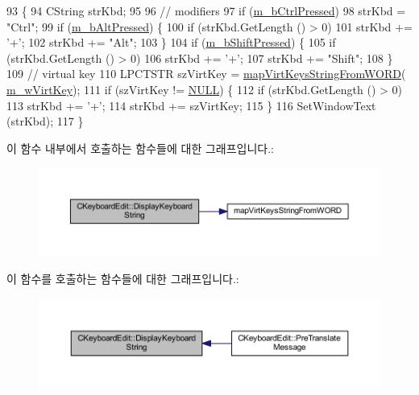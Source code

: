 \begin{DoxyCode}
93 \{
94   CString strKbd;
95 
96   \textcolor{comment}{// modifiers}
97   \textcolor{keywordflow}{if} (\mbox{\hyperlink{class_c_keyboard_edit_a0dbb417bbaaeaa95c00fceaecd210064}{m\_bCtrlPressed}})
98     strKbd = \textcolor{stringliteral}{"Ctrl"};
99   \textcolor{keywordflow}{if} (\mbox{\hyperlink{class_c_keyboard_edit_a724b035848eeca7bebc24e1309afeb6d}{m\_bAltPressed}}) \{
100     \textcolor{keywordflow}{if} (strKbd.GetLength () > 0)
101       strKbd += \textcolor{charliteral}{'+'};
102     strKbd += \textcolor{stringliteral}{"Alt"};
103   \}
104   \textcolor{keywordflow}{if} (\mbox{\hyperlink{class_c_keyboard_edit_ac4a4f45be9ef923961ab92a48a28f789}{m\_bShiftPressed}}) \{
105     \textcolor{keywordflow}{if} (strKbd.GetLength () > 0)
106       strKbd += \textcolor{charliteral}{'+'};
107     strKbd += \textcolor{stringliteral}{"Shift"};
108   \}
109   \textcolor{comment}{// virtual key}
110   LPCTSTR szVirtKey = \mbox{\hyperlink{_keyboard_edit_8cpp_a114f9fd0dc48511b3d2799f967360087}{mapVirtKeysStringFromWORD}}(
      \mbox{\hyperlink{class_c_keyboard_edit_a6a4efef92e151002720d0d930db29521}{m\_wVirtKey}});
111   \textcolor{keywordflow}{if} (szVirtKey != \mbox{\hyperlink{getopt1_8c_a070d2ce7b6bb7e5c05602aa8c308d0c4}{NULL}}) \{
112     \textcolor{keywordflow}{if} (strKbd.GetLength () > 0)
113       strKbd += \textcolor{charliteral}{'+'};
114     strKbd += szVirtKey;
115   \}
116   SetWindowText (strKbd);
117 \}
\end{DoxyCode}
이 함수 내부에서 호출하는 함수들에 대한 그래프입니다.\+:
\nopagebreak
\begin{figure}[H]
\begin{center}
\leavevmode
\includegraphics[width=350pt]{class_c_keyboard_edit_a432e346d4d5285064b5e92ff4c6a0385_cgraph}
\end{center}
\end{figure}
이 함수를 호출하는 함수들에 대한 그래프입니다.\+:
\nopagebreak
\begin{figure}[H]
\begin{center}
\leavevmode
\includegraphics[width=350pt]{class_c_keyboard_edit_a432e346d4d5285064b5e92ff4c6a0385_icgraph}
\end{center}
\end{figure}
\mbox{\label{class_c_keyboard_edit_a920dfccebef5e2260e59003e4959ef9f}} 

